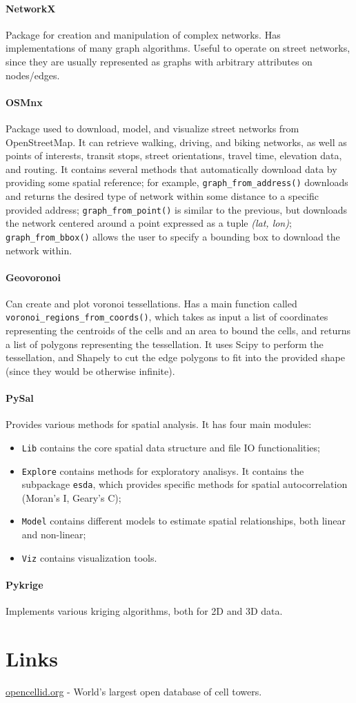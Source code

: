 \paragraph{NetworkX}
Package for creation and manipulation of complex networks. Has implementations of many graph algorithms. Useful to operate on street networks, since they are usually represented as graphs with arbitrary attributes on nodes/edges.

\paragraph{OSMnx}
Package used to download, model, and visualize street networks from OpenStreetMap. It can retrieve walking, driving, and biking networks, as well as points of interests, transit stops, street orientations, travel time, elevation data, and routing. It contains several methods that automatically download data by providing some spatial reference; for example, \texttt{graph\_from\_address()} downloads and returns the desired type of network within some distance to a specific provided address; \texttt{graph\_from\_point()} is similar to the previous, but downloads the network centered around a point expressed as a tuple \textit{(lat, lon)}; \texttt{graph\_from\_bbox()} allows the user to specify a bounding box to download the network within.

\paragraph{Geovoronoi}
Can create and plot voronoi tessellations. Has a main function called \texttt{voronoi\_regions\_from\_coords()}, which takes as input a list of coordinates representing the centroids of the cells and an area to bound the cells, and returns a list of polygons representing the tessellation. It uses Scipy to perform the tessellation, and Shapely to cut the edge polygons to fit into the provided shape (since they would be otherwise infinite).

\paragraph{PySal}
Provides various methods for spatial analysis. It has four main modules:
\begin{itemize}[itemsep=-5pt, label=-]
    \item \texttt{Lib} contains the core spatial data structure and file IO functionalities;
    \item \texttt{Explore} contains methods for exploratory analisys. It contains the subpackage \texttt{esda}, which provides specific methods for spatial autocorrelation (Moran's I, Geary's C);
    \item \texttt{Model} contains different models to estimate spatial relationships, both linear and non-linear;
    \item \texttt{Viz} contains visualization tools.
\end{itemize}

\paragraph{Pykrige}
Implements various kriging algorithms, both for 2D and 3D data.

\section{Links}
\href{https://opencellid.org}{opencellid.org} - World's largest open database of cell towers.